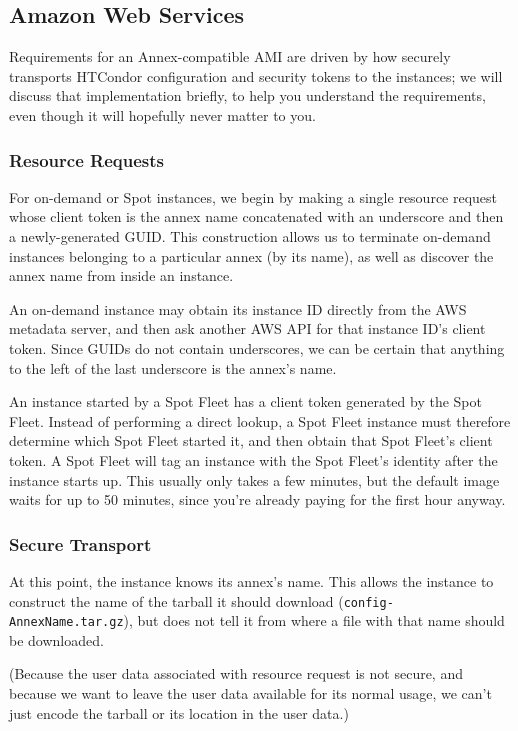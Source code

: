 \subsection{\label{sec:clouds-services-aws}Amazon Web Services}

Requirements for an Annex-compatible AMI are driven by how 
securely transports HTCondor configuration and security tokens to the
instances; we will discuss that implementation briefly, to help you
understand the requirements, even though it will hopefully never matter
to you.

\subsubsection{Resource Requests}

For on-demand or Spot instances, we begin by making a single resource request
whose client token is the annex name concatenated with an underscore and then
a newly-generated GUID.  This construction allows us to terminate on-demand
instances belonging to a particular annex (by its name), as well as discover
the annex name from inside an instance.

An on-demand instance may obtain its instance ID directly from the AWS
metadata server, and then ask another AWS API for that instance ID's
client token.  Since GUIDs do not contain underscores, we can be certain
that anything to the left of the last underscore is the annex's name.

An instance started by a Spot Fleet has a client token generated by the
Spot Fleet.  Instead of performing a direct lookup, a Spot Fleet instance
must therefore determine which Spot Fleet started it, and then obtain that
Spot Fleet's client token.  A Spot Fleet will tag an instance with the
Spot Fleet's identity after the instance starts up.  This usually only
takes a few minutes, but the default image waits for up to 50 minutes,
since you're already paying for the first hour anyway.

\subsubsection{Secure Transport}

At this point, the instance knows its annex's name.  This allows the
instance to construct the name of the tarball it should download
({\tt config-AnnexName.tar.gz}), but does not tell it from where a file
with that name should be downloaded.

(Because the user data associated with resource request is not secure,
and because we want to leave the user data available for its normal
usage, we can't just encode the tarball or its location in the user data.)

